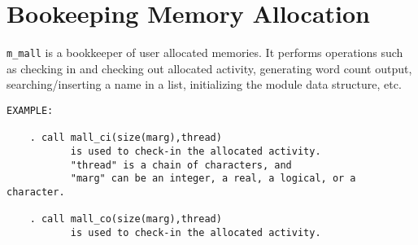 %
\section{Bookeeping Memory Allocation}
%
{\tt m\_mall} is a bookkeeper of user allocated memories.
It performs operations such as checking in and checking out allocated 
activity, generating word count output, searching/inserting a name in a list,
initializing the module data structure, etc.
%
\begin{verbatim}
EXAMPLE:

    . call mall_ci(size(marg),thread)
           is used to check-in the allocated activity.
           "thread" is a chain of characters, and
           "marg" can be an integer, a real, a logical, or a character.

    . call mall_co(size(marg),thread)
           is used to check-in the allocated activity.
\end{verbatim}
